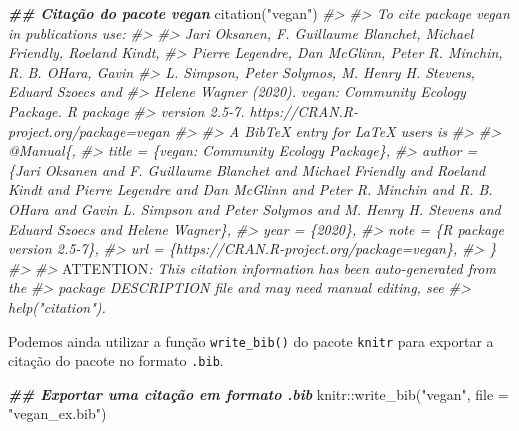 \documentclass[
]{book}
\newenvironment{Shaded}{\begin{snugshade}}{\end{snugshade}}
\newcommand{\AlertTok}[1]{\textcolor[rgb]{0.33,0.33,0.33}{#1}}
\newcommand{\AttributeTok}[1]{\textcolor[rgb]{0.61,0.61,0.61}{#1}}
\newcommand{\CommentTok}[1]{\textcolor[rgb]{0.37,0.37,0.37}{\textit{#1}}}
\newcommand{\DocumentationTok}[1]{\textcolor[rgb]{0.37,0.37,0.37}{\textbf{\textit{#1}}}}
\newcommand{\FunctionTok}[1]{\textcolor[rgb]{0,0,0}{#1}}
\newcommand{\NormalTok}[1]{#1}
\newcommand{\SpecialCharTok}[1]{\textcolor[rgb]{0,0,0}{#1}}
\newcommand{\StringTok}[1]{\textcolor[rgb]{0.5,0.5,0.5}{#1}}
\begin{document}
\begin{Shaded}
\begin{Highlighting}[]
\DocumentationTok{\#\# Citação do pacote vegan}
\FunctionTok{citation}\NormalTok{(}\StringTok{"vegan"}\NormalTok{)}
\CommentTok{\#\textgreater{} }
\CommentTok{\#\textgreater{} To cite package \textquotesingle{}vegan\textquotesingle{} in publications use:}
\CommentTok{\#\textgreater{} }
\CommentTok{\#\textgreater{}   Jari Oksanen, F. Guillaume Blanchet, Michael Friendly, Roeland Kindt,}
\CommentTok{\#\textgreater{}   Pierre Legendre, Dan McGlinn, Peter R. Minchin, R. B. O\textquotesingle{}Hara, Gavin}
\CommentTok{\#\textgreater{}   L. Simpson, Peter Solymos, M. Henry H. Stevens, Eduard Szoecs and}
\CommentTok{\#\textgreater{}   Helene Wagner (2020). vegan: Community Ecology Package. R package}
\CommentTok{\#\textgreater{}   version 2.5{-}7. https://CRAN.R{-}project.org/package=vegan}
\CommentTok{\#\textgreater{} }
\CommentTok{\#\textgreater{} A BibTeX entry for LaTeX users is}
\CommentTok{\#\textgreater{} }
\CommentTok{\#\textgreater{}   @Manual\{,}
\CommentTok{\#\textgreater{}     title = \{vegan: Community Ecology Package\},}
\CommentTok{\#\textgreater{}     author = \{Jari Oksanen and F. Guillaume Blanchet and Michael Friendly and Roeland Kindt and Pierre Legendre and Dan McGlinn and Peter R. Minchin and R. B. O\textquotesingle{}Hara and Gavin L. Simpson and Peter Solymos and M. Henry H. Stevens and Eduard Szoecs and Helene Wagner\},}
\CommentTok{\#\textgreater{}     year = \{2020\},}
\CommentTok{\#\textgreater{}     note = \{R package version 2.5{-}7\},}
\CommentTok{\#\textgreater{}     url = \{https://CRAN.R{-}project.org/package=vegan\},}
\CommentTok{\#\textgreater{}   \}}
\CommentTok{\#\textgreater{} }
\CommentTok{\#\textgreater{} }\AlertTok{ATTENTION}\CommentTok{: This citation information has been auto{-}generated from the}
\CommentTok{\#\textgreater{} package DESCRIPTION file and may need manual editing, see}
\CommentTok{\#\textgreater{} \textquotesingle{}help("citation")\textquotesingle{}.}
\end{Highlighting}
\end{Shaded}

Podemos ainda utilizar a função \texttt{write\_bib()} do pacote \texttt{knitr} para exportar a citação do pacote no formato \texttt{.bib}.

\begin{Shaded}
\begin{Highlighting}[]
\DocumentationTok{\#\# Exportar uma citação em formato .bib}
\NormalTok{knitr}\SpecialCharTok{::}\FunctionTok{write\_bib}\NormalTok{(}\StringTok{"vegan"}\NormalTok{, }\AttributeTok{file =} \StringTok{"vegan\_ex.bib"}\NormalTok{)}
\end{Highlighting}
\end{Shaded}
\end{document}
